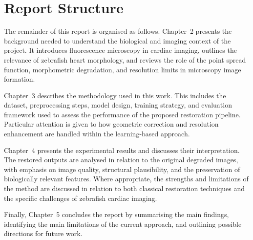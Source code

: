 \section{Report Structure}

The remainder of this report is organised as follows. Chapter~2 presents the background needed to understand the biological and imaging context of the project. It introduces fluorescence microscopy in cardiac imaging, outlines the relevance of zebrafish heart morphology, and reviews the role of the point spread function, morphometric degradation, and resolution limits in microscopy image formation.

Chapter~3 describes the methodology used in this work. This includes the dataset, preprocessing steps, model design, training strategy, and evaluation framework used to assess the performance of the proposed restoration pipeline. Particular attention is given to how geometric correction and resolution enhancement are handled within the learning-based approach.

Chapter~4 presents the experimental results and discusses their interpretation. The restored outputs are analysed in relation to the original degraded images, with emphasis on image quality, structural plausibility, and the preservation of biologically relevant features. Where appropriate, the strengths and limitations of the method are discussed in relation to both classical restoration techniques and the specific challenges of zebrafish cardiac imaging.

Finally, Chapter~5 concludes the report by summarising the main findings, identifying the main limitations of the current approach, and outlining possible directions for future work.